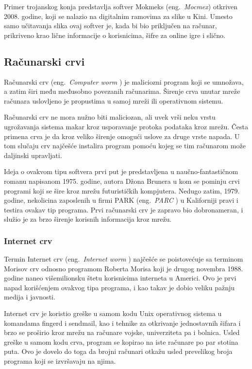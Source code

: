 \documentclass[a4paper]{article}
\begin{document}
Primer trojanskog konja predstavlja softver Mokmeks (eng.~{\em Mocmex}) otkriven 2008. godine, koji se nalazio na digitalnim ramovima za slike u Kini. Umesto samo učitavanja slika ovaj softver je, kada bi bio priključen na računar, prikriveno krao lične informacije o korisnicima, šifre za online igre i slično. \cite{ethics}

\subsection{Računarski crvi}
Računarski crv (eng.~{\em Computer worm }) je maliciozni program koji se umnožava, a zatim širi među međusobno povezanih računarima. Širenje crva unutar mreže računara uslovljeno je propustima u samoj mreži ili operativnom sistemu.  \cite{norton_worm, ethics}

Računarski crv ne mora nužno biti maliciozan, ali uvek vrši neku vrstu ugrožavanja sistema makar kroz usporavanje protoka podataka kroz mrežu. Česta primena crva je da kroz veliko širenje omogući uslove za druge vrste napada. U tom slučaju crv najčešće instalira program pomoću kojeg se tim računarom može daljinski upravljati. \cite{ethics}

Ideja o ovakvom tipu softvera prvi put je predstavljena u naučno-fantastičnom romanu napisanom 1975. godine, autora Džona Brunera u kom se pominju crvi programi koji se šire kroz mrežu futurističkih kompjutera. Nedugo zatim, 1979. godine, nekolicina zaposlenih u firmi PARK (eng.~{\em PARC }) u Kaliforniji pravi i testira ovakav tip programa.
Prvi računarski crv je zapravo bio dobronameran, i služio je za brzo širenje korisnih informacija kroz mrežu. \cite{internet_worm}


\subsubsection{Internet crv}

Termin Internet crv  (eng.~{\em Internet worm }) najčešće se poistovećuje sa terminom Morisov crv odnosno programom Roberta Morisa koji je drugog novembra 1988. godine naneo višemilionsku štetu korisnicima interneta u Americi. Ovo je prvi napad korišćenjem ovakvog tipa programa, i kao takav je dobio veliku pažnju medija i javnosti. \cite{ethics}

Internet crv je koristio greške u samom kodu Unix operativnog sistema u komandama fingerd i sendmail, kao i tehnike za otkrivanje jednostavnih šifara i brzo se proširio kroz mrežu na računare vojske, univerziteta pa i bolnica. Usled greške u samom kodu crva, program se kopirao na iste računare po par stotina puta. Ovo je dovelo do toga da brojni računari otkažu usled prevelikog broja programa koji se izvršavaju na njima.  \cite{internet_worm}
\end{document}
